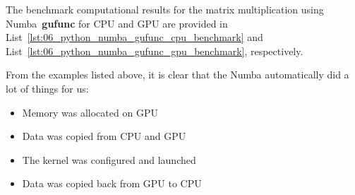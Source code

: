 








\par
The benchmark computational results for the matrix multiplication using Numba~\textbf{gufunc} for CPU and GPU are provided in List~\ref{lst:06_python_numba_gufunc_cpu_benchmark} and List~\ref{lst:06_python_numba_gufunc_gpu_benchmark}, respectively.








\par
From the examples listed above, it is clear that the Numba automatically did a lot of things for us:
\begin{itemize}
    \item Memory was allocated on GPU
    \item Data was copied from CPU and GPU
    \item The kernel was configured and launched
    \item Data was copied back from GPU to CPU
\end{itemize}


